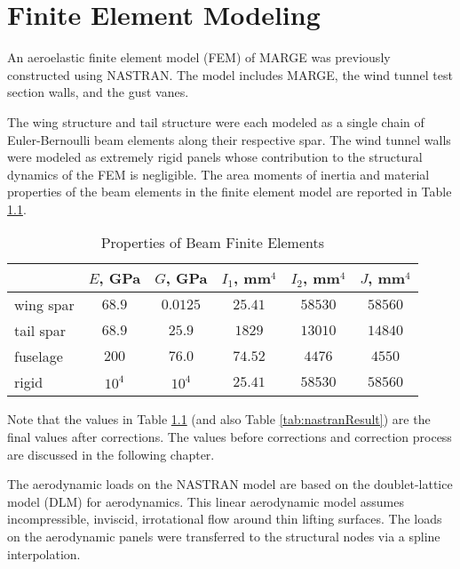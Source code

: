 \chapter{Finite Element Modeling}
\label{ch:nastran}

An aeroelastic finite element model (FEM) of MARGE was previously constructed using NASTRAN. The model includes MARGE, the wind tunnel test section walls, and the gust vanes.


The wing structure and tail structure were each modeled as a single chain of Euler-Bernoulli beam elements along their respective spar. The wind tunnel walls were modeled as extremely rigid panels whose contribution to the structural dynamics of the FEM is negligible. The area moments of inertia and material properties of the beam elements in the finite element model are reported in Table \ref{tab:beamInertia}.
\begin{table}[H]
    \centering
    \caption{Properties of Beam Finite Elements}
    \begin{tabular}{lccccc}
        \hline\hline
                  & $E$, GPa & $G$, GPa & $I_1$, mm$^4$ & $I_2$, mm$^4$ & $J$, mm$^4$ \\
        \hline
        wing spar & $68.9$   & $0.0125$ & $25.41$       & $58530$       & $58560$     \\
        tail spar & $68.9$   & $25.9$   & $1829$        & $13010$       & $14840$     \\
        fuselage  & $200$    & $76.0$   & $74.52$       & $4476 $       & $4550 $     \\
        rigid     & $10^4$   & $10^4$   & $25.41$       & $58530$       & $58560$     \\
        \hline\hline
    \end{tabular}
    \label{tab:beamInertia}
\end{table}
Note that the values in Table \ref{tab:beamInertia} (and also Table \ref{tab:nastranResult}) are the final values after corrections. The values before corrections and correction process are discussed in the following chapter.

The aerodynamic loads on the NASTRAN model are based on the doublet-lattice model (DLM) for aerodynamics. This linear aerodynamic model assumes incompressible, inviscid, irrotational flow around thin lifting surfaces. The loads on the aerodynamic panels were transferred to the structural nodes via a spline interpolation.

